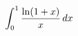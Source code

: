 \documentclass[preview]{standalone}
\begin{document}
\begin{align*}
\special{dvisvgm:raw <g id='unique000'>}\displaystyle\int_0^1\frac{\ln(1+x)}{x}\,dx\special{dvisvgm:raw </g>}
\end{align*}
\end{document}
